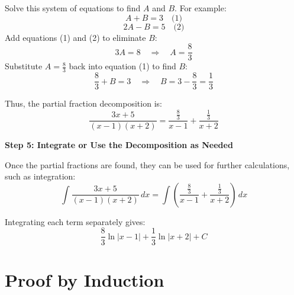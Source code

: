 \documentclass{report}
\begin{document}
{	Solve this system of equations to find $A$ and $B$. For example:
	\[
		A + B = 3 \quad \text{(1)}
	\]
	\[
		2A - B = 5 \quad \text{(2)}
	\]
	Add equations (1) and (2) to eliminate $B$:
	\[
		3A = 8 \quad \Rightarrow \quad A = \frac{8}{3}
	\]
	Substitute $A = \frac{8}{3}$ back into equation (1) to find $B$:
	\[
		\frac{8}{3} + B = 3 \quad \Rightarrow \quad B = 3 - \frac{8}{3} = \frac{1}{3}
	\]

	Thus, the partial fraction decomposition is:
	\[
		\frac{3x + 5}{(x - 1)(x + 2)} = \frac{\frac{8}{3}}{x - 1} + \frac{\frac{1}{3}}{x + 2}
	\]

	\textbf{Step 5: Integrate or Use the Decomposition as Needed}

	Once the partial fractions are found, they can be used for further calculations, such as integration:
	\[
		\int \frac{3x + 5}{(x - 1)(x + 2)} \, dx = \int \left(\frac{\frac{8}{3}}{x - 1} + \frac{\frac{1}{3}}{x + 2}\right) \, dx
	\]

	Integrating each term separately gives:
	\[
		\frac{8}{3} \ln|x - 1| + \frac{1}{3} \ln|x + 2| + C
	\]
}


\section{Proof by Induction}

\end{document}
